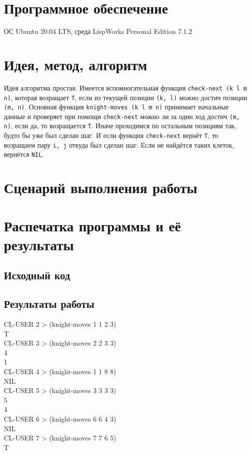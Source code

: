 \documentclass[12pt]{article}
\begin{document}
\section{Программное обеспечение}
{\large ОС Ubuntu 20.04 LTS, среда LispWorks Personal Edition 7.1.2}

\section{Идея, метод, алгоритм}
{\large 
Идея алгоритма простая. Имеется вспомногательная функция {\tt check-next (k l m n)},
которая возращает {\tt T}, если из текущей позиции {\tt (k, l)} можно достич позиции {\tt (m, n)}.
Основная функция {\tt knight-moves (k l m n)} принимает начальные данные и проверяет при
помощи {\tt check-next} можно ли за один ход достич {\tt (m, n)}, если да, то возращается {\tt T}.
Иначе проходимся по остальным позициям так, будто бы уже был сделан шаг. И если функция 
{\tt check-next} вернёт {\tt T}, то возращаем пару {\tt i, j} откуда был сделан шаг. Если
не найдётся таких клеток, вернётся {\tt NIL}.\\
}

\section{Сценарий выполнения работы}

\section{Распечатка программы и её результаты}

\subsection{Исходный код}


\subsection{Результаты работы}
% 

{\large 
CL-USER 2 > (knight-moves 1 1 2 3) \\ T \\
CL-USER 3 > (knight-moves 2 2 3 3) \\ 4 \\ 1 \\
CL-USER 4 > (knight-moves 1 1 8 8) \\ NIL \\
CL-USER 5 > (knight-moves 3 3 3 3) \\ 5 \\ 4 \\
CL-USER 6 > (knight-moves 6 6 4 3) \\ NIL \\ 
CL-USER 7 > (knight-moves 7 7 6 5) \\ T
}
\end{document}
